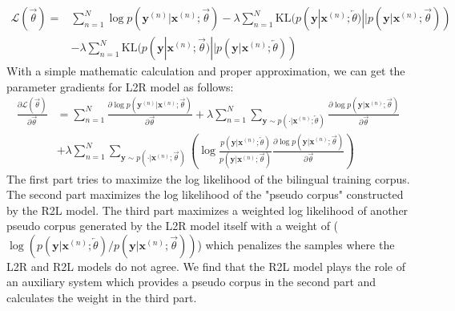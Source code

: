 \documentclass[a4paper]{article}
\begin{document}
\begin{CJK*}{UTF8}{gbsn}
\begin{equation}
\begin{aligned}
\mathcal{L}(\overrightarrow{\theta}) = &\sum_{n=1}^{N}  \log{ p(\mathbf{y}^{(n)}| \mathbf{x}^{(n)};\overrightarrow{\theta} )} 
 - \lambda \sum_{n=1}^{N} \text{KL}( p(\mathbf{y}|\mathbf{x}^{(n)}; \overleftarrow{\theta} ) || p(\mathbf{y}|\mathbf{x}^{(n)}; \overrightarrow{\theta} ) ) \\
& - \lambda \sum_{n=1}^{N} \text{KL}( p(\mathbf{y}|\mathbf{x}^{(n)}; \overrightarrow{\theta} ) || p(\mathbf{y}|\mathbf{x}^{(n)}; \overleftarrow{\theta} ) ) 
\end{aligned}
\label{equ:regularization}
\end{equation}
With a simple mathematic calculation and proper approximation, we can get the parameter gradients for L2R model as follows:
\begin{equation}
\begin{aligned}
\frac{ \partial \mathcal{L}(\overrightarrow{\theta}) }{ \partial \overrightarrow{\theta}} & = \sum_{n=1}^{N} \frac{ \partial  \log{ p(\mathbf{y}^{(n)}| \mathbf{x}^{(n)};\overrightarrow{\theta} )} }{ \partial \overrightarrow{\theta} }  
 + \lambda \sum_{n=1}^{N} \sum_{\mathbf{y} \sim p(\cdot|\mathbf{x}^{(n)}; \overleftarrow{\theta} )} \frac{\partial \log p(\mathbf{y}|\mathbf{x}^{(n)}; \overrightarrow{\theta} ) }{\partial \overrightarrow{\theta}} \\
& + \lambda \sum_{n=1}^{N} \sum_{\mathbf{y} \sim p(\cdot|\mathbf{x}^{(n)}; \overrightarrow{\theta} )}
 \left( \log \frac{p(\mathbf{y}|\mathbf{x}^{(n)}; \overleftarrow{\theta} )}{ p(\mathbf{y}|\mathbf{x}^{(n)}; \overrightarrow{\theta} )} 
\frac{\partial \log p(\mathbf{y}|\mathbf{x}^{(n)}; \overrightarrow{\theta} ) }{\partial \overrightarrow{\theta}} \right)
\end{aligned}
\label{equ:gradient_l2r}
\end{equation}
The first part tries to maximize the log likelihood of the bilingual training corpus. The second part maximizes the log likelihood of the "pseudo corpus"  constructed by the R2L model. The third part maximizes a weighted log likelihood of another pseudo corpus generated by the L2R model itself with a weight of ($\log (p(\mathbf{y}|\mathbf{x}^{(n)}; \overleftarrow{\theta} ) / p(\mathbf{y}|\mathbf{x}^{(n)}; \overrightarrow{\theta}))$) which penalizes the samples where the L2R and R2L models do not agree. We find that the R2L model plays the role of an auxiliary system which provides a pseudo corpus in the second part and calculates the weight in the third part.


\end{CJK*}
\end{document}
